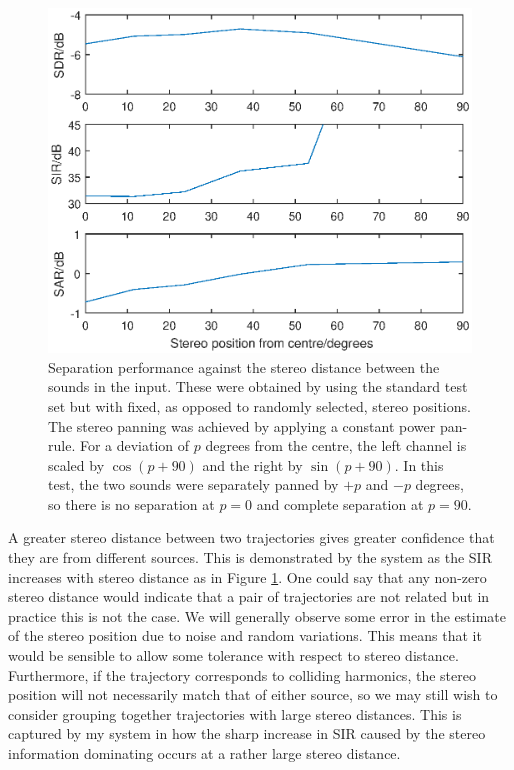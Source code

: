 \documentclass[12pt,a4paper,twoside,openright]{report}
\begin{document}
\begin{figure}
\centering
\includegraphics[width=0.7\linewidth]{./StereoPlots}
\caption[Separation performance against the stereo distance between the sounds in the input.]{Separation performance against the stereo distance between the sounds in the input. These were obtained by using the standard test set but with fixed, as opposed to randomly selected, stereo positions. The stereo panning was achieved by applying a constant power pan-rule. For a deviation of $ p $ degrees from the centre, the left channel is scaled by $ \cos(p+90) $ and the right by $ \sin(p+90) $. In this test, the two sounds were separately panned by $ +p $ and $ -p $ degrees, so there is no separation at $ p=0 $ and complete separation at $ p=90 $.}
\label{fig:StereoPlots}
\end{figure}


A greater stereo distance between two trajectories gives greater confidence that they are from different sources. This is demonstrated by the system as the SIR increases with stereo distance as in Figure \ref{fig:StereoPlots}. One could say that any non-zero stereo distance would indicate that a pair of trajectories are not related but in practice this is not the case. We will generally observe some error in the estimate of the stereo position due to noise and random variations. This means that it would be sensible to allow some tolerance with respect to stereo distance. Furthermore, if the trajectory corresponds to colliding harmonics, the stereo position will not necessarily match that of either source, so we may still wish to consider grouping together trajectories with large stereo distances. This is captured by my system in how the sharp increase in SIR caused by the stereo information dominating occurs at a rather large stereo distance.
\end{document}

